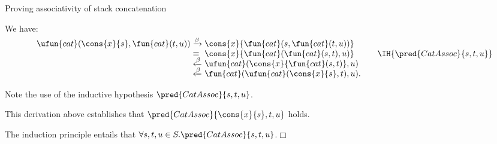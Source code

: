 %
\begin{frame}{Proving associativity of stack concatenation}

  We have:
  \begin{equation*}
    \begin{array}{r@{\;}l@{\;}l@{\qquad}r@{}}
      \ufun{cat}(\cons{x}{s},\fun{cat}(t,u))
      & \xrightarrow{\smash\beta}
      & \cons{x}{\fun{cat}(s,\fun{cat}(t,u))}\\
      & \equiv
      & \cons{x}{\fun{cat}(\fun{cat}(s,t),u)}
      & \IH{\pred{CatAssoc}{s,t,u}}\\
      & \xleftarrow{\smash\beta}
      & \ufun{cat}(\cons{x}{\fun{cat}(s,t)},u)\\
      & \xleftarrow{\smash\beta}
      & \fun{cat}(\ufun{cat}(\cons{x}{s},t),u).
    \end{array}
  \end{equation*}

  Note the use of the inductive hypothesis \(\pred{CatAssoc}{s,t,u}\).

  \bigskip

  This derivation above establishes that
  \(\pred{CatAssoc}{\cons{x}{s},t,u}\) holds.

  \bigskip

  The induction principle entails that \(\forall s,t,u \in
  S.\pred{CatAssoc}{s,t,u}\).\hfill\(\Box\)

\end{frame}
